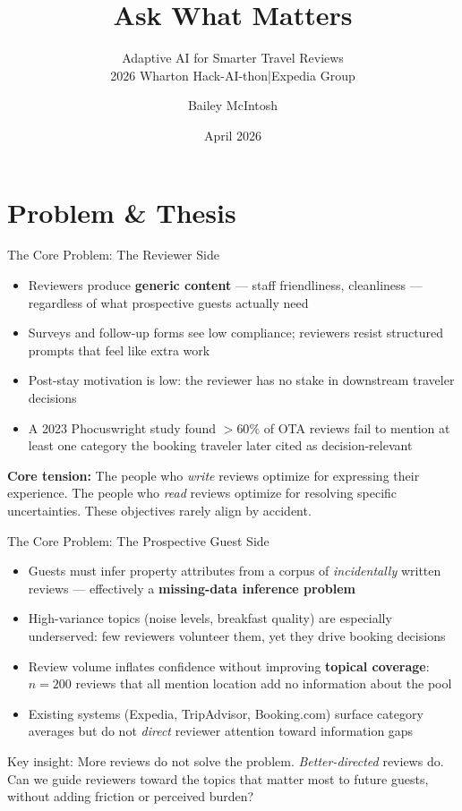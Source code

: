 \documentclass[aspectratio=169,10pt]{beamer}
\title{\textbf{Ask What Matters}}
\subtitle{Adaptive AI for Smarter Travel Reviews\\[0.3em]
  \small 2026 Wharton Hack-AI-thon\quad|\quad Expedia Group}
\author{Bailey McIntosh}
\date{April 2026}
\begin{document}
\begin{frame}[plain]
  \titlepage
\end{frame}


\section{Problem \& Thesis}

\begin{frame}{The Core Problem: The Reviewer Side}
\begin{itemize}
  \item Reviewers produce \textbf{generic content} — staff friendliness,
        cleanliness — regardless of what prospective guests actually need
  \item Surveys and follow-up forms see low compliance; reviewers resist
        structured prompts that feel like extra work
  \item Post-stay motivation is low: the reviewer has no stake in downstream
        traveler decisions
  \item A 2023 Phocuswright study found $>60\%$ of OTA reviews fail to mention
        at least one category the booking traveler later cited as decision-relevant
\end{itemize}

\bigskip
\textbf{Core tension:}
The people who \textit{write} reviews optimize for expressing their experience.
The people who \textit{read} reviews optimize for resolving specific uncertainties.
These objectives rarely align by accident.
\end{frame}


\begin{frame}{The Core Problem: The Prospective Guest Side}
\begin{itemize}
  \item Guests must infer property attributes from a corpus of \textit{incidentally}
        written reviews — effectively a \textbf{missing-data inference problem}
  \item High-variance topics (noise levels, breakfast quality) are especially
        underserved: few reviewers volunteer them, yet they drive booking decisions
  \item Review volume inflates confidence without improving \textbf{topical coverage}:
        $n=200$ reviews that all mention location add no information about the pool
  \item Existing systems (Expedia, TripAdvisor, Booking.com) surface category averages
        but do not \textit{direct} reviewer attention toward information gaps
\end{itemize}

\bigskip
\alert{Key insight:} More reviews do not solve the problem.
\textit{Better-directed} reviews do.
Can we guide reviewers toward the topics that matter most to future guests,
without adding friction or perceived burden?
\end{frame}
\end{document}
